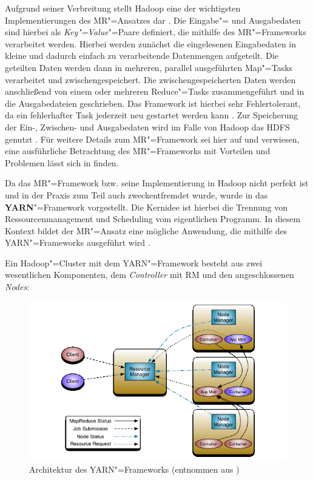 Aufgrund seiner Verbreitung stellt Hadoop eine der wichtigsten Implementierungen des \gls{MR}"=Ansatzes dar \cite{PoweredByHadoop}.
Die Eingabe"= und Ausgabedaten sind hierbei als \emph{Key"=Value}"=Paare definiert, die mithilfe des \gls{MR}"=Frameworks verarbeitet werden.
Hierbei werden zunächst die eingelesenen Eingabedaten in kleine und dadurch einfach zu verarbeitende Datenmengen aufgeteilt.
Die geteilten Daten werden dann in mehreren, parallel ausgeführten Map"=Tasks verarbeitet und zwischengespeichert.
Die zwischengespeicherten Daten werden anschließend von einem oder mehreren Reduce"=Tasks zusammengeführt und in die Ausgabedateien geschrieben.
Das Framework ist hierbei sehr Fehlertolerant, da ein fehlerhafter Task jederzeit neu gestartet werden kann \cite{Dean2004,Dean2010}.
Zur Speicherung der Ein-, Zwischen- und Ausgabedaten wird im Falle von Hadoop das \gls{HDFS} genutzt \cite{HadoopMapRedTutorial271}.
Für weitere Details zum \gls{MR}"=Framework sei hier auf \cite{Dean2004} und \cite{Dean2010} verwiesen, eine ausführliche Betrachtung des \gls{MR}"=Frameworks mit Vorteilen und Problemen lässt sich in \cite{Lee2012} finden.

Da das \gls{MR}"=Framework bzw. seine Implementierung in Hadoop nicht perfekt ist und in der Praxis zum Teil auch zweckentfremdet wurde, wurde in \cite{Vavilapalli2013} das \textbf{\gls{YARN}}"=Framework vorgestellt.
Die Kernidee ist hierbei die Trennung von Ressourcenmanagement und Scheduling vom eigentlichen Programm.
In diesem Kontext bildet der \gls{MR}"=Ansatz eine mögliche Anwendung, die mithilfe des \gls{YARN}"=Frameworks ausgeführt wird \cite{Vavilapalli2013}.

Ein Hadoop"=Cluster mit dem \gls{YARN}"=Framework besteht aus zwei wesentlichen Komponenten, dem \emph{Controller} mit \gls{RM} und den angeschlossenen \emph{Nodes}:

\begin{figure}[h]
    \includegraphics{./resources/yarn_architecture.png}
    \caption[Architektur des YARN"=Frameworks]
    {Architektur des \gls{YARN}"=Frameworks (entnommen aus \cite{HadoopYarnArch271})}
    \label{fig:yarnarch}
\end{figure}

